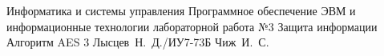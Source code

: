 \documentclass{bmstu}
\begin{document}
\makereporttitle
{Информатика и системы управления} %
{Программное обеспечение ЭВМ и информационные технологии}
{лабораторной работа №3} %
{Защита информации} %
{Алгоритм AES} %
{3} %
{Лысцев~Н.~Д./ИУ7-73Б} %
{Чиж~И.~С.} %
{}

\maketableofcontents





%


\makebibliography
\end{document}
